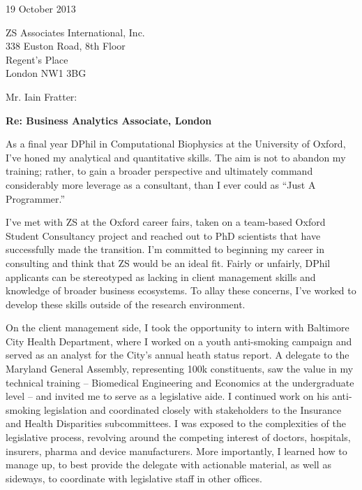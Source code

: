 \documentclass[a4paper]{../res}
\begin{document}
 
\begin{sloppypar}
 


\begin{resume} 
 
\vspace{2\baselineskip}

19 October 2013
\vspace{1\baselineskip}

ZS Associates International, Inc. \\
338 Euston Road, 8th Floor \\
Regent's Place \\
London NW1 3BG
\vspace{1\baselineskip}

Mr. Iain Fratter: %

\textbf{Re: Business Analytics Associate, London}

As a final year DPhil in Computational Biophysics at the University of Oxford, I've honed my analytical and quantitative skills. The aim is not to abandon my training; rather, to gain a broader perspective and ultimately command considerably more leverage as a consultant, than I ever could as ``Just A Programmer.''

I've met with ZS at the Oxford career fairs, taken on a team-based Oxford Student Consultancy project and reached out to PhD scientists that have successfully made the transition. I'm committed to beginning my career in consulting and think that ZS would be an ideal fit. Fairly or unfairly, DPhil applicants can be stereotyped as lacking in client management skills and knowledge of broader business ecosystems. To allay these concerns, I've worked to develop these skills outside of the research environment. 


On the client management side, I took the opportunity to intern with Baltimore City Health Department, where I worked on a youth anti-smoking campaign and served as an analyst for the City's annual heath status report. A delegate to the Maryland General Assembly, representing 100k constituents, saw the value in my technical training -- Biomedical Engineering and Economics at the undergraduate level -- and invited me to serve as a legislative aide. I continued work on his anti-smoking legislation and coordinated closely with stakeholders to the Insurance and Health Disparities subcommittees. I was exposed to the complexities of the legislative process, revolving around the competing interest of doctors, hospitals, insurers, pharma and device manufacturers. More importantly, I learned how to manage up, to best provide the delegate with actionable material, as well as sideways, to coordinate with legislative staff in other offices.


\end{resume}
\end{sloppypar}
\end{document}
